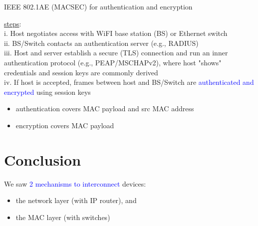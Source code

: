 \documentclass[11pt]{article}
\begin{document}
IEEE 802.1AE (MACSEC) for authentication and encryption

\underline{steps}: \\
i. Host negotiates access with WiFI base station (BS) or Ethernet switch\\
ii. BS/Switch contacts an authentication server (e.g., RADIUS) \\
iii. Host and server establish a secure (TLS) connection and run an inner authentication protocol (e.g., PEAP/MSCHAPv2), where host "shows" credentials and session keys are commonly derived \\
iv. If host is accepted, frames between host and BS/Switch are \textcolor{blue}{authenticated and encrypted} using session keys
\begin{itemize}
	\item authentication covers MAC payload and src MAC address
	\item encryption covers MAC payload
\end{itemize}

\section*{Conclusion }

We saw \textcolor{blue}{2 mechanisms to interconnect} devices:
\begin{itemize}
	\begin{itemize}
		\item the network layer (with IP router), and 
		\item the MAC layer (with switches)
	\end{itemize}
\end{itemize}
\end{document}
